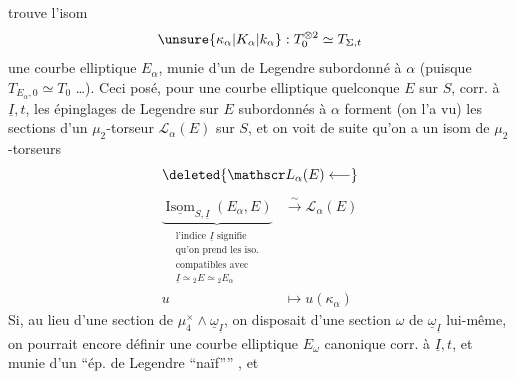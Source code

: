 trouve l'isom
\[
\unsure{\kappa_\alpha|K_\alpha|k_\alpha}:T_0^{\otimes2}\simeq T_{\Sigma,t}
\]
 une courbe elliptique $E_\alpha$,  munie d'un   de Legendre subordonné à $\alpha$ (puisque $T_{E_\alpha,0}\simeq T_0$ \ldots).
Ceci posé, pour une courbe elliptique quelconque $E$ sur $S$, corr. à $\underline I,t$, les épinglages de Legendre sur $E$ subordonnés à $\alpha$ forment (on l'a vu) les sections d'un $\mu_2$-torseur $\mathscr L_\alpha(E)$ sur $S$, et on voit de suite qu'on a un isom de $\mu_2$-torseurs
\[
\deleted{\mathscr L_\alpha(E)\longleftarrow}
\]
\[
\begin{aligned}
\underbrace{\underline{\operatorname{Isom}}_{S,\underline I}(E_\alpha,E)}_{
\substack{\text{l'indice }\underline I\text{ signifie}\\
\text{qu'on prend les iso.}\\
\text{compatibles avec}\\
\underline I\simeq {}_2E\simeq {}_2E_\alpha}}
&\xrightarrow{\sim}\mathscr L_\alpha(E)\\
u&\longmapsto u(\kappa_\alpha)
\end{aligned}\tag*{(57)}
\]
Si, au lieu d'une section \inserted{$\alpha$} de $\mu_4^\times\mathbin{\wedge}\underline\omega_{\underline I}$, on disposait d'une section $\omega$ de $\underline\omega_{\underline I}$ lui-même, on pourrait encore définir une courbe elliptique $E_\omega$ canonique corr. à $\underline I,t$, et munie d'un ``ép. de Legendre ``naïf'''' , et
